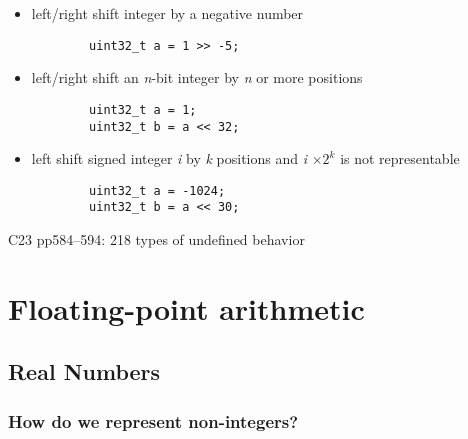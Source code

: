 \documentclass[12pt]{article}
\begin{document}
\begin{itemize}
    \item left/right shift integer by a negative number
    \begin{verbatim}
        uint32_t a = 1 >> -5;
    \end{verbatim}

    \item left/right shift an \textit{n}-bit integer by \textit{n} or more positions
    \begin{verbatim}
        uint32_t a = 1;
        uint32_t b = a << 32;
    \end{verbatim}

    \item left shift signed integer \textit{i} by \textit{k} positions and \textit{i} $ \times 2^{k} $ is not representable
    \begin{verbatim}
        uint32_t a = -1024;
        uint32_t b = a << 30;
    \end{verbatim}
\end{itemize}
C23 pp584--594: 218 types of undefined behavior






















\newpage
\section{Floating-point arithmetic}

\subsection{Real Numbers}

\subsubsection{How do we represent non-integers?}
\end{document}
